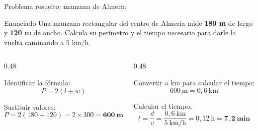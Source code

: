 \documentclass[aspectratio=169, 10pt, spanish]{beamer}
\begin{document}
\begin{frame}{Problema resuelto: manzana de Almería}
  \begin{definicionbox}{Enunciado}
    \AlmFontSmall Una manzana rectangular del centro de Almería mide
    \textbf{180 m} de largo y \textbf{120 m} de ancho.
    Calcula su perímetro y el tiempo necesario para darle
    la vuelta caminando a 5 km/h.
  \end{definicionbox}

  \vspace{0.2cm}
  \begin{columns}[t]
    \begin{column}{0.48\textwidth}
      \begin{pasobox}[1]
        \AlmFontSmall Identificar la fórmula:
        \[P = 2(l + w)\]
      \end{pasobox}
      \vspace{0.2cm}
      \begin{pasobox}[2]
        \AlmFontSmall Sustituir valores:
        \[P = 2(180 + 120) = 2 \times 300 = \mathbf{600\ m}\]
      \end{pasobox}
    \end{column}
    \begin{column}{0.48\textwidth}
      \begin{pasobox}[3]
        \AlmFontSmall Convertir a km para calcular el tiempo:
        \[600\ \text{m} = 0{,}6\ \text{km}\]
      \end{pasobox}
      \vspace{0.2cm}
      \begin{pasobox}[4]
        \AlmFontSmall Calcular el tiempo:
        \[t = \frac{d}{v} = \frac{0{,}6\ \text{km}}{5\ \text{km/h}}
          = 0{,}12\ \text{h} = \mathbf{7{,}2\ \text{min}}\]
      \end{pasobox}
    \end{column}
  \end{columns}
\end{frame}
\end{document}
